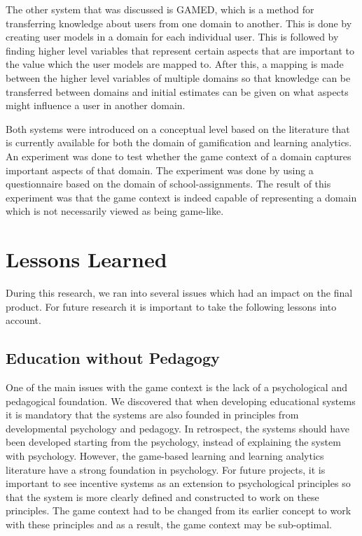\documentclass[11pt]{article}
\begin{document}
The other system that was discussed is GAMED, which is a method for transferring knowledge about users from one domain to another. This is done by creating user models in a domain for each individual user. This is followed by finding higher level variables that represent certain aspects that are important to the value which the user models are mapped to. After this, a mapping is made between the higher level variables of multiple domains so that knowledge can be transferred between domains and initial estimates can be given on what aspects might influence a user in another domain.

Both systems were introduced on a conceptual level based on the literature that is currently available for both the domain of gamification and learning analytics. An experiment was done to test whether the game context of a domain captures important aspects of that domain. The experiment was done by using a questionnaire based on the domain of school-assignments. The result of this experiment was that the game context is indeed capable of representing a domain which is not necessarily viewed as being game-like. 


\section{Lessons Learned}\label{sec:discussion}
During this research, we ran into several issues which had an impact on the final product. For future research it is important to take the following lessons into account.

\subsection{Education without Pedagogy}
One of the main issues with the game context is the lack of a psychological and pedagogical foundation. We discovered that when developing educational systems it is mandatory that the systems are also founded in principles from developmental psychology and pedagogy. In retrospect, the systems should have been developed starting from the psychology, instead of explaining the system with psychology. However, the game-based learning and learning analytics literature have a strong foundation in psychology. For future projects, it is important to see incentive systems as an extension to psychological principles so that the system is more clearly defined and constructed to work on these principles. The game context had to be changed from its earlier concept to work with these principles and as a result, the game context may be sub-optimal.
\end{document}
